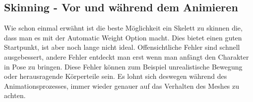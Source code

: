 \subsection{Skinning - Vor und während dem Animieren}
Wie schon einmal erwähnt ist die beste Möglichkeit ein Skelett zu skinnen die, dass man es mit der Automatic Weight Option macht.
Dies bietet einen guten Startpunkt, ist aber noch lange nicht ideal. Offensichtliche Fehler sind schnell ausgebessert, andere Fehler entdeckt man erst wenn man
anfängt den Charakter in Pose zu bringen. Diese Fehler können zum Beispiel unrealistische Bewegung oder herausragende Körperteile sein.
Es lohnt sich deswegen während des Animationsprozesses, immer wieder genauer auf das Verhalten des Meshes zu achten.

